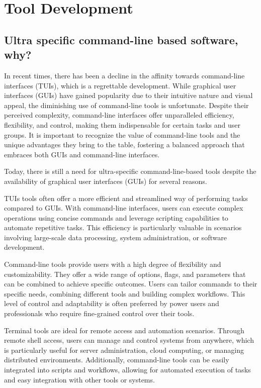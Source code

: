 \documentclass[../Master.tex]{subfiles}
\begin{document}
\chapter{Tool Development}\label{chap:tooldev}

\section{Ultra specific command-line based software, why?}\label{sec:specific-software}
In recent times, there has been a decline in the affinity towards command-line interfaces (TUIs), which is a regrettable development. While graphical user interfaces (GUIs) have gained popularity due to their intuitive nature and visual appeal, the diminishing use of command-line tools is unfortunate. Despite their perceived complexity, command-line interfaces offer unparalleled efficiency, flexibility, and control, making them indispensable for certain tasks and user groups. It is important to recognize the value of command-line tools and the unique advantages they bring to the table, fostering a balanced approach that embraces both GUIs and command-line interfaces.

Today, there is still a need for ultra-specific command-line-based tools despite the availability of graphical user interfaces (GUIs) for several reasons.

TUIs tools often offer a more efficient and streamlined way of performing tasks compared to GUIs. With command-line interfaces, users can execute complex operations using concise commands and leverage scripting capabilities to automate repetitive tasks. This efficiency is particularly valuable in scenarios involving large-scale data processing, system administration, or software development.

Command-line tools provide users with a high degree of flexibility and customizability. They offer a wide range of options, flags, and parameters that can be combined to achieve specific outcomes. Users can tailor commands to their specific needs, combining different tools and building complex workflows. This level of control and adaptability is often preferred by power users and professionals who require fine-grained control over their tools.

Terminal tools are ideal for remote access and automation scenarios. Through remote shell access, users can manage and control systems from anywhere, which is particularly useful for server administration, cloud computing, or managing distributed environments. Additionally, command-line tools can be easily integrated into scripts and workflows, allowing for automated execution of tasks and easy integration with other tools or systems.
\end{document}
